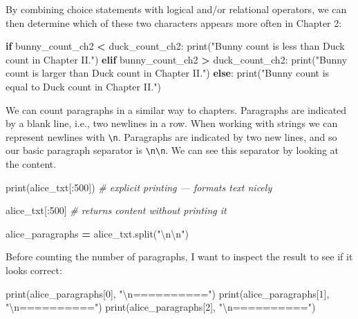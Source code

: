 \documentclass[
]{book}
\newenvironment{Shaded}{\begin{snugshade}}{\end{snugshade}}
\newcommand{\BuiltInTok}[1]{#1}
\newcommand{\CharTok}[1]{\textcolor[rgb]{0.31,0.60,0.02}{#1}}
\newcommand{\CommentTok}[1]{\textcolor[rgb]{0.56,0.35,0.01}{\textit{#1}}}
\newcommand{\ControlFlowTok}[1]{\textcolor[rgb]{0.13,0.29,0.53}{\textbf{#1}}}
\newcommand{\DecValTok}[1]{\textcolor[rgb]{0.00,0.00,0.81}{#1}}
\newcommand{\NormalTok}[1]{#1}
\newcommand{\OperatorTok}[1]{\textcolor[rgb]{0.81,0.36,0.00}{\textbf{#1}}}
\newcommand{\StringTok}[1]{\textcolor[rgb]{0.31,0.60,0.02}{#1}}
\begin{document}
By combining choice statements with logical and/or relational operators, we can then determine which of these two characters
appears more often in Chapter 2:

\begin{Shaded}
\begin{Highlighting}[]
\ControlFlowTok{if}\NormalTok{ bunny_count_ch2 }\OperatorTok{<}\NormalTok{ duck_count_ch2:}
    \BuiltInTok{print}\NormalTok{(}\StringTok{"Bunny count is less than Duck count in Chapter II."}\NormalTok{)}
\ControlFlowTok{elif}\NormalTok{ bunny_count_ch2 }\OperatorTok{>}\NormalTok{ duck_count_ch2:}
    \BuiltInTok{print}\NormalTok{(}\StringTok{"Bunny count is larger than Duck count in Chapter II."}\NormalTok{)}
\ControlFlowTok{else}\NormalTok{:}
    \BuiltInTok{print}\NormalTok{(}\StringTok{"Bunny count is equal to Duck count in Chapter II."}\NormalTok{)}
\end{Highlighting}
\end{Shaded}

We can count paragraphs in a similar way to chapters. Paragraphs are indicated by a blank line, i.e., two newlines in a row. When working with strings we can represent newlines with \texttt{\textbackslash{}n}. Paragraphs are indicated by two new lines, and so our basic paragraph separator is \texttt{\textbackslash{}n\textbackslash{}n}. We can see this separator by looking at the content.

\begin{Shaded}
\begin{Highlighting}[]
\BuiltInTok{print}\NormalTok{(alice_txt[:}\DecValTok{500}\NormalTok{]) }\CommentTok{# explicit printing --- formats text nicely}

\NormalTok{alice_txt[:}\DecValTok{500}\NormalTok{] }\CommentTok{# returns content without printing it}
\end{Highlighting}
\end{Shaded}

\begin{Shaded}
\begin{Highlighting}[]
\NormalTok{alice_paragraphs }\OperatorTok{=}\NormalTok{ alice_txt.split(}\StringTok{"}\CharTok{\textbackslash{}n\textbackslash{}n}\StringTok{"}\NormalTok{)}
\end{Highlighting}
\end{Shaded}

Before counting the number of paragraphs, I want to inspect the result to see if it looks correct:

\begin{Shaded}
\begin{Highlighting}[]
\BuiltInTok{print}\NormalTok{(alice_paragraphs[}\DecValTok{0}\NormalTok{], }\StringTok{"}\CharTok{\textbackslash{}n}\StringTok{=========="}\NormalTok{)}
\BuiltInTok{print}\NormalTok{(alice_paragraphs[}\DecValTok{1}\NormalTok{], }\StringTok{"}\CharTok{\textbackslash{}n}\StringTok{=========="}\NormalTok{)}
\BuiltInTok{print}\NormalTok{(alice_paragraphs[}\DecValTok{2}\NormalTok{], }\StringTok{"}\CharTok{\textbackslash{}n}\StringTok{=========="}\NormalTok{)}
\end{Highlighting}
\end{Shaded}
\end{document}
